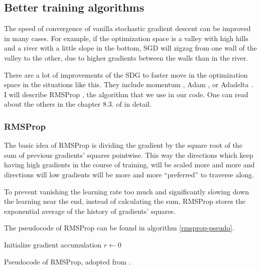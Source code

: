 \subsection{Better training algorithms}
The speed of convergence of vanilla stochastic gradient descent can be improved in many cases. For example, if the optimization space is a valley with high hills and a river with a little slope in the bottom, SGD will zigzag from one wall of the valley to the other, due to higher gradients between the walls than in the river.

There are a lot of improvements of the SDG to faster move in the optimization space in the situations like this. They include momentum \cite{momentum}, Adam \cite{adam}, or Adadelta \cite{adadelta}. I will describe RMSProp \cite{rmsprop}, the algorithm that we use in our code. One can read about the others in the chapter 8.3. of \cite{dlbook} in detail.

\subsubsection{RMSProp}
The basic idea of RMSProp is dividing the gradient by the square root of the sum of previous gradients' squares pointwise. This way the directions which keep having high gradients in the course of training, will be scaled more and more and directions will low gradients will be more and more ``preferred'' to traverse along.

To prevent vanishing the learning rate too much and significantly slowing down the learning near the end, instead of calculating the sum, RMSProp stores the exponential average of the history of gradients' squares.

The pseudocode of RMSProp can be found in algorithm \ref{rmsprop-pseudo}.
\begin{algorithm}
  \DontPrintSemicolon
  Initialize gradient accumulation $r \leftarrow 0$\;
  \caption{Pseudocode of RMSProp, adopted from \cite{dlbook}.}\label{rmsprop-pseudo}
\end{algorithm}

